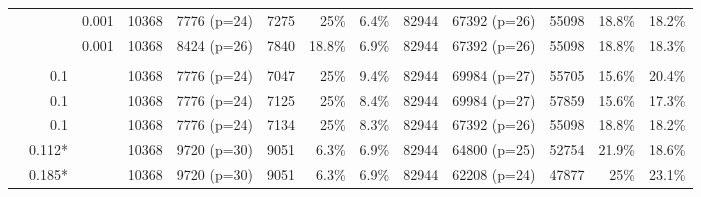 \begin{table*}[p]
\begin{tabular}{l|rr|rrrrr|rrrrr}
    & \color{red}{0.08} & 0.001  & 10368 & 7776 (p=24) & 7275 & 25\% & 6.4\% & 82944 & 67392 (p=26) & 55098 & 18.8\% & 18.2\% \\
    
    & \color{red}{0.05} & 0.001  & 10368 & 8424 (p=26) & 7840 & 18.8\% & 6.9\% & 82944 & 67392 (p=26) & 55098 & 18.8\% & 18.3\% \\
    
    & & & & & & & & & & & &\\
    
    & 0.1 & \color{red}{0.0006}  & 10368 & 7776 (p=24) & 7047 & 25\% & 9.4\% & 82944 & 69984 (p=27) & 55705 & 15.6\% & 20.4\% \\
    
    & 0.1 & \color{red}{0.0008}  & 10368 & 7776 (p=24) & 7125 & 25\% & 8.4\% & 82944 & 69984 (p=27) & 57859 & 15.6\% & 17.3\% \\
    
    & 0.1 & \color{red}{0.0010}  & 10368 & 7776 (p=24) & 7134 & 25\% & 8.3\% & 82944 & 67392 (p=26) & 55098 & 18.8\% & 18.2\% \\
    
    & 0.112* & \color{red}{0.0030}  & 10368 &  9720 (p=30) & 9051 & 6.3\% & 6.9\% & 82944 & 64800 (p=25) & 52754 & 21.9\% & 18.6\% \\
    
    & 0.185* &\color{red}{0.0050}  & 10368 & 9720 (p=30) & 9051 & 6.3\% & 6.9\% & 82944 & 62208 (p=24) & 47877 & 25\%& 23.1\% \\
    \bottomrule
  \end{tabular}
\end{table*}